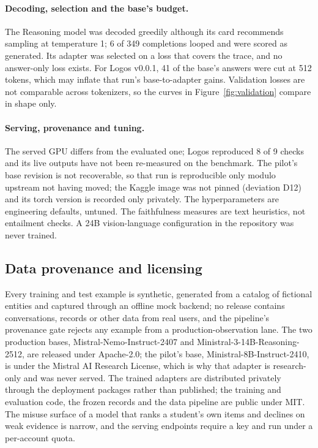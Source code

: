 \paragraph{Decoding, selection and the base's budget.}
The Reasoning model was decoded greedily although its card recommends sampling at temperature 1; 6 of 349 completions looped and were scored as generated. Its adapter was selected on a loss that covers the trace, and no answer-only loss exists. For Logos v0.0.1, 41 of the base's answers were cut at 512 tokens, which may inflate that run's base-to-adapter gains. Validation losses are not comparable across tokenizers, so the curves in Figure~\ref{fig:validation} compare in shape only.

\paragraph{Serving, provenance and tuning.}
The served GPU differs from the evaluated one; Logos reproduced 8 of 9 checks and its live outputs have not been re-measured on the benchmark. The pilot's base revision is not recoverable, so that run is reproducible only modulo upstream not having moved; the Kaggle image was not pinned (deviation D12) and its torch version is recorded only privately. The hyperparameters are engineering defaults, untuned. The faithfulness measures are text heuristics, not entailment checks. A 24B vision-language configuration in the repository was never trained.

\subsection{Data provenance and licensing}
Every training and test example is synthetic, generated from a catalog of fictional entities and captured through an offline mock backend; no release contains conversations, records or other data from real users, and the pipeline's provenance gate rejects any example from a production-observation lane. The two production bases, Mistral-Nemo-Instruct-2407 and Ministral-3-14B-Reasoning-2512, are released under Apache-2.0; the pilot's base, Ministral-8B-Instruct-2410, is under the Mistral AI Research License, which is why that adapter is research-only and was never served. The trained adapters are distributed privately through the deployment packages rather than published; the training and evaluation code, the frozen records and the data pipeline are public under MIT. The misuse surface of a model that ranks a student's own items and declines on weak evidence is narrow, and the serving endpoints require a key and run under a per-account quota.
